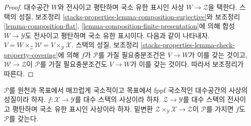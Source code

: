 \begin{proof}
대수공간 $W$와 전사이고 평탄하며 국소 유한 표시인 사상
$W \to \mathcal{Z}$을 택한다. 스택의 성질, 보조정리
\ref{stacks-properties-lemma-composition-surjective}와 보조정리
\ref{lemma-composition-flat},
\ref{lemma-composition-finite-presentation}에 의해 합성
$W \to \mathcal{Y}$도 전사이고 평탄하며 국소 유한 표시이다.
다음과 같이 나타내자.
$V = W \times_\mathcal{Z} \mathcal{W} = V \times_\mathcal{Y} \mathcal{X}$.%
스택의 성질, 보조정리
\ref{stacks-properties-lemma-check-property-covering}에 의해 $f$가
$\mathcal{P}$를 가질 필요충분조건은 $V \to W$가 이를 갖는 것이고,
$\mathcal{W} \to \mathcal{Z}$이 $\mathcal{P}$를 가질 필요충분조건도
$V \to W$가 이를 갖는 것이다.%
따라서 보조정리가 따른다.
\end{proof}

\begin{lemma}
\label{lemma-descent-property}
$\mathcal{P}$를 원천과 목표에서 매끄럽게 국소적이고 목표에서 fppf
국소적인 대수공간의 사상의 성질이라 하자.
$f : \mathcal{X} \to \mathcal{Y}$를 대수 스택의 사상이라 하자.
$\mathcal{Z} \to \mathcal{Y}$를 대수 스택의 전사이고 평탄하며 국소
유한 표시인 사상이라 하자. 밑변환
$\mathcal{Z} \times_\mathcal{Y} \mathcal{X} \to \mathcal{Z}$이
$\mathcal{P}$를 가지면 $f$도 $\mathcal{P}$를 갖는다.
\end{lemma}

